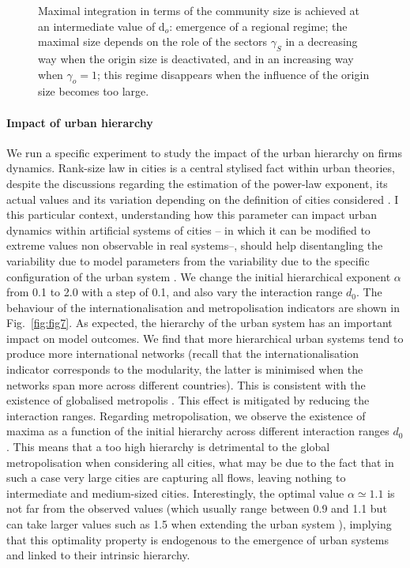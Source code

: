 \documentclass[10pt,letterpaper]{article}
\begin{document}
\begin{figure}
	\caption{Maximal integration in terms of the community size is achieved at an intermediate value of d$_o$: emergence of a regional regime; the maximal size depends on the role of the sectors $\gamma_S$ in a decreasing way when the origin size is deactivated, and in an increasing way when $\gamma_o=1$; this regime disappears when the influence of the origin size becomes too large.\label{fig:fig6}}
\end{figure}


\paragraph{Impact of urban hierarchy}

We run a specific experiment to study the impact of the urban hierarchy on firms dynamics. Rank-size law in cities is a central stylised fact within urban theories, despite the discussions regarding the estimation of the power-law exponent, its actual values and its variation depending on the definition of cities considered \cite{cottineau2017metazipf,corral2020truncated}. I this particular context, understanding how this parameter can impact urban dynamics within artificial systems of cities -- in which it can be modified to extreme values non observable in real systems--, should help disentangling the variability due to model parameters from the variability due to the specific configuration of the urban system \cite{raimbault2019space}. We change the initial hierarchical exponent $\alpha$ from 0.1 to 2.0 with a step of 0.1, and also vary the interaction range $d_0$. The behaviour of the internationalisation and metropolisation indicators are shown in Fig.~\ref{fig:fig7}. As expected, the hierarchy of the urban system has an important impact on model outcomes. We find that more hierarchical urban systems tend to produce more international networks (recall that the internationalisation indicator corresponds to the modularity, the latter is minimised when the networks span more across different countries). This is consistent with the existence of globalised metropolis \cite{Sassen1991}. This effect is mitigated by reducing the interaction ranges. Regarding metropolisation, we observe the existence of maxima as a function of the initial hierarchy across different interaction ranges $d_0$. This means that a too high hierarchy is detrimental to the global metropolisation when considering all cities, what may be due to the fact that in such a case very large cities are capturing all flows, leaving nothing to intermediate and medium-sized cities. Interestingly, the optimal value $\alpha \simeq 1.1$ is not far from the observed values (which usually range between 0.9 and 1.1 but can take larger values such as 1.5 when extending the urban system \cite{Raimbault_2020}), implying that this optimality property is endogenous to the emergence of urban systems and linked to their intrinsic hierarchy.
\end{document}
